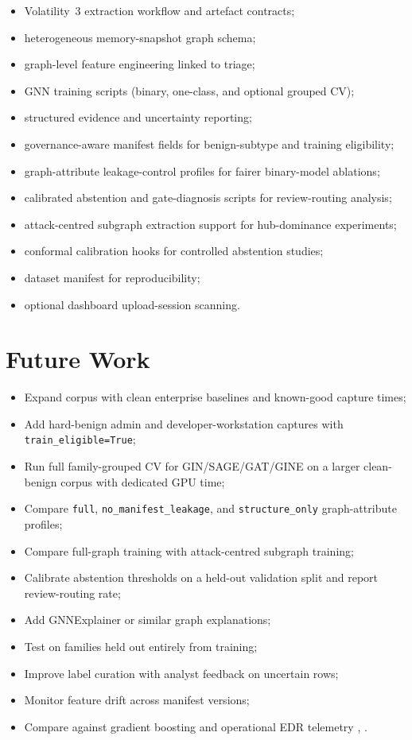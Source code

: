 \begin{itemize}
\item Volatility~3 extraction workflow and artefact contracts;
\item heterogeneous memory-snapshot graph schema;
\item graph-level feature engineering linked to triage;
\item GNN training scripts (binary, one-class, and optional grouped CV);
\item structured evidence and uncertainty reporting;
\item governance-aware manifest fields for benign-subtype and training eligibility;
\item graph-attribute leakage-control profiles for fairer binary-model ablations;
\item calibrated abstention and gate-diagnosis scripts for review-routing analysis;
\item attack-centred subgraph extraction support for hub-dominance experiments;
\item conformal calibration hooks for controlled abstention studies;
\item dataset manifest for reproducibility;
\item optional dashboard upload-session scanning.
\end{itemize}

\section{Future Work}

\begin{itemize}
\item Expand corpus with clean enterprise baselines and known-good capture times;
\item Add hard-benign admin and developer-workstation captures with \texttt{train\_eligible=True};
\item Run full family-grouped CV for GIN/SAGE/GAT/GINE on a larger clean-benign corpus with dedicated GPU time;
\item Compare \texttt{full}, \texttt{no\_manifest\_leakage}, and \texttt{structure\_only} graph-attribute profiles;
\item Compare full-graph training with attack-centred subgraph training;
\item Calibrate abstention thresholds on a held-out validation split and report review-routing rate;
\item Add GNNExplainer \cite{ying2019gnnexplainer} or similar graph explanations;
\item Test on families held out entirely from training;
\item Improve label curation with analyst feedback on uncertain rows;
\item Monitor feature drift across manifest versions;
\item Compare against gradient boosting and operational EDR telemetry \cite{pedregosa2011sklearn}, \cite{ucci2019survey}.
\end{itemize}

